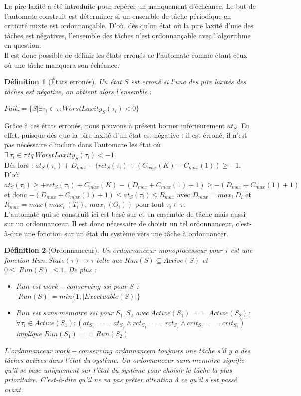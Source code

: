 \documentclass[11pt,a4paper,oneside]{book}
\theoremstyle{break}
\newtheorem{defin}{Définition}
\theoremstyle{breakplain}
\begin{document}
La pire laxité a été introduite pour repérer un manquement d'échéance. Le but de l'automate construit est déterminer si un ensemble de tâche périodique en criticité mixte est ordonnançable. D'où, dès qu'un état où la pire laxité d'une des tâches est négatives, l'ensemble des tâches n'est ordonnançable avec l'algorithme en question.\\
Il est donc possible de définir les états erronés de l'automate comme étant ceux où une tâche manquera son échéance.

\begin{defin}[États erronés]
Un état $S$ est erroné si l'une des pire laxités des tâches est négative, on obtient alors l'ensemble :

$Fail_\tau = \{S|\exists \tau_i \in \tau : WorstLaxity_S(\tau_i) < 0  \}$\\
\end{defin}

Grâce à ces états erronés, nous pouvons à présent borner inférieurement $at_S$. En effet, puisque dès que la pire laxité d'un état est négative : il est érroné, il n'est pas nécéssaire d'inclure dans l'automate les état où $\exists\ \tau_i \in \tau\ tq\ WorstLaxity_S(\tau_i) < -1$.\\
Dés lors : $at_S(\tau_i) + D_{max} - (rct_S(\tau_i) + (C_{max}(K)-C_{max}(1)) \geq -1$.\\
D'où $at_S(\tau_i) \geq + rct_S(\tau_i) + C_{max}(K) - (D_{max}+C_{max}(1)+1) \geq - (D_{max}+C_{max}(1)+1)$ et donc $- (D_{max}+C_{max}(1)+1) \leq at_S(\tau_i) \leq R_{max}$ avec $D_{max} = max_i\ D_i$ et $R_{max} = max(max_i\ (T_i),\ max_i\ (O_i))$ pour tout $\tau_i \in \tau$.\\

L'automate qui se construit ici est basé sur et un ensemble de tâche mais aussi sur un ordonnanceur. Il est donc nécessaire de choisir un tel ordonnanceur, c'est-à-dire une fonction sur un état du système vers une tâche à ordonnancer.

\begin{defin}[Ordonnanceur]
Un $ordonnanceur$ monoprocesseur pour $\tau$ est une fonction $Run : State(\tau) \rightarrow \tau$ telle que $Run(S) \subseteq Active(S)$ et $0 \leq |Run(S)| \leq 1$.
De plus :
\begin{itemize}
\item $Run$ est $work-conserving$ ssi pour $S$ : $ |Run(S)| = min\{1, |Exectuable(S)|\}$
\item $Run$ est $sans\ memoire$ ssi pour $S_1,S_2$ avec $Active(S_1) == Active(S_2)$:
$\forall \tau_i \in Active(S_1) : (at_{S_1} == at_{S_2} \wedge rct_{S_1} == rct_{S_2} \wedge crit_{S_1} == crit_{S_2} )$ implique $Run(S_1) == Run(S_2)$
\end{itemize}

L'ordonnanceur $work-conserving$ ordonnancera toujours une tâche s'il y a des tâches actives dans l'état du système. Un ordonnanceur $sans\ memoire$ signifie qu'il se base uniquement sur l'état du système pour choisir la tâche la plus prioritaire. C'est-à-dire qu'il ne va pas prêter attention à ce qu'il s'est passé avant.
\end{defin}
\end{document}
